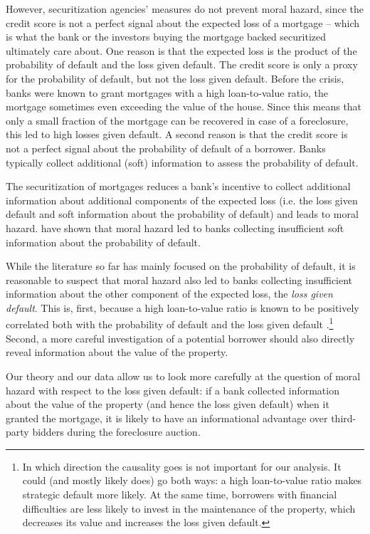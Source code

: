 \documentclass[11pt,twopage]{article}
\begin{document}
However, securitization agencies' measures do not prevent moral
hazard, since the credit score is not a perfect signal about the
expected loss of a mortgage -- which is what the bank or the investors
buying the mortgage backed securitized ultimately care about. One
reason is that the expected loss is the product of the probability of
default and the loss given default. The credit score is only a proxy
for the probability of default, but not the loss given default. Before
the crisis, banks were known to grant mortgages with a high
loan-to-value ratio, the mortgage sometimes even exceeding the value
of the house. Since this means that only a small fraction of the
mortgage can be recovered in case of a foreclosure, this led to high
losses given default. A second reason is that the credit score is not
a perfect signal about the probability of default of a borrower. Banks
typically collect additional (soft) information to assess the
probability of default.

The securitization of mortgages reduces a bank's incentive to collect
additional information about additional components of the expected
loss (i.e. the loss given default and soft information about the
probability of default) and leads to moral hazard. \cite{keys2008did}
have shown that moral hazard led to banks collecting insufficient soft
information about the probability of default.

While the literature so far has mainly focused on the probability of
default, it is reasonable to suspect that moral hazard also led to
banks collecting insufficient information about the other component of
the expected loss, the \emph{loss given default}. This is, first,
because a high loan-to-value ratio is known to be positively
correlated both with the probability of default and the loss given
default \citep[see][and the references
therein]{qi2009loss}.\footnote{In which direction the causality goes
  is not important for our analysis. It could (and mostly likely does)
  go both ways: a high loan-to-value ratio makes strategic default
  more likely. At the same time, borrowers with financial difficulties
  are less likely to invest in the maintenance of the property, which
  decreases its value and increases the loss given default.} Second, a
more careful investigation of a potential borrower should also
directly reveal information about the value of the property.

Our theory and our data allow us to look more carefully at the
question of moral hazard with respect to the loss given default: if a
bank collected information about the value of the property (and hence
the loss given default) when it granted the mortgage, it is likely to
have an informational advantage over third-party bidders during the
foreclosure auction.
\end{document}
